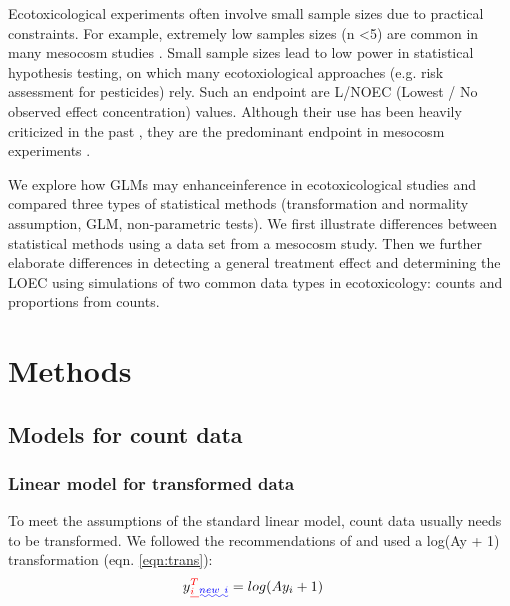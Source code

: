 \documentclass[twocolumn, natbib]{svjour3}
\providecommand{\DIFadd}[1]{{\protect\color{blue}\uwave{#1}}} %
\providecommand{\DIFdel}[1]{{\protect\color{red}\sout{#1}}}                      %
\providecommand{\DIFaddbegin}{} %
\providecommand{\DIFaddend}{} %
\providecommand{\DIFdelbegin}{} %
\providecommand{\DIFdelend}{} %
\begin{document}
Ecotoxicological experiments often involve small sample sizes due to practical constraints. 
For example, extremely low samples sizes (n \textless 5) are common in many mesocosm studies \citep{sanderson_pesticide_2002,szocs_analysing_2015}.
Small sample sizes lead to low power in statistical hypothesis testing, on which many ecotoxiological approaches (e.g. risk assessment for pesticides) rely. 
Such an endpoint are L/NOEC (Lowest / No observed effect concentration) values.
Although their use has been heavily criticized in the past \citep{laskowski_good_1995}, they are the predominant endpoint in mesocosm experiments \citep{brock_minimum_2015, efsa_ppr_guidance_2013}. 

We explore how GLMs may enhance\DIFaddbegin \DIFadd{, when appropriately used, }\DIFaddend inference in ecotoxicological studies and compared three types of statistical methods (transformation and normality assumption, GLM, non-parametric tests).
We first illustrate differences between statistical methods using a data set from a mesocosm study.
Then we further elaborate differences in detecting a general treatment effect and determining the LOEC using simulations of two common data types in ecotoxicology: counts and proportions from counts. 



\section{Methods}
\label{sec:methods}

\subsection{Models for count data}
\label{ssec:counts}
\subsubsection{Linear model for transformed data}
To meet the assumptions of the standard linear model, count data usually needs to be transformed. 
We followed the recommendations of \citet{van_den_brink_impact_2000} and used a log(Ay + 1) transformation (eqn. \ref{eqn:trans}):
\begin{align}
  y\DIFdelbegin \DIFdel{_i^T }\DIFdelend \DIFaddbegin \DIFadd{_{new~i} }\DIFaddend & = log(Ay_i + 1) \label{eqn:trans}
\end{align}
\end{document}
